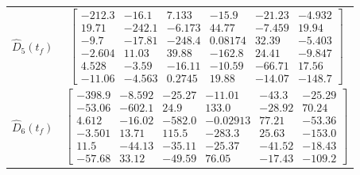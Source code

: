 \begin{table}[htbp]
\begin{center}
\begin{tabular}{c|c}
$\hat{D}_5(t_f)$ & $ \left[\begin{array}{cccccc} -212.3 & -16.1 & 7.133 & -15.9 & -21.23 & -4.932\\ 19.71 & -242.1 & -6.173 & 44.77 & -7.459 & 19.94\\ -9.7 & -17.81 & -248.4 & 0.08174 & 32.39 & -5.403\\ -2.604 & 11.03 & 39.88 & -162.8 & 24.41 & -9.847\\ 4.528 & -3.59 & -16.11 & -10.59 & -66.71 & 17.56\\ -11.06 & -4.563 & 0.2745 & 19.88 & -14.07 & -148.7 \end{array}\right] $ \\ 
$\hat{D}_6(t_f)$ & $ \left[\begin{array}{cccccc} -398.9 & -8.592 & -25.27 & -11.01 & -43.3 & -25.29\\ -53.06 & -602.1 & 24.9 & 133.0 & -28.92 & 70.24\\ 4.612 & -16.02 & -582.0 & -0.02913 & 77.21 & -53.36\\ -3.501 & 13.71 & 115.5 & -283.3 & 25.63 & -153.0\\ 11.5 & -44.13 & -35.11 & -25.37 & -41.52 & -18.43\\ -57.68 & 33.12 & -49.59 & 76.05 & -17.43 & -109.2 \end{array}\right] $ \\ 
\end{tabular}
\end{center}
\label{chUV_AID.tb.UVSE3_AID_dragParam}
\end{table}



